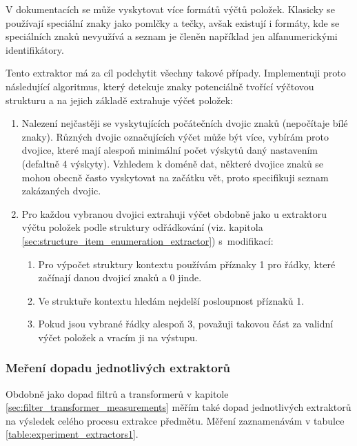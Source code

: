 \documentclass[thesis=M,czech]{FITthesis}[2019/12/23]
\begin{document}
V dokumentacích se může vyskytovat více formátů výčtů položek. Klasicky se používají speciální znaky jako pomlčky a tečky, avšak existují i formáty, kde se speciálních znaků nevyužívá a seznam je členěn například jen alfanumerickými identifikátory.

Tento extraktor má za cíl podchytit všechny takové případy. Implementuji proto následující algoritmus, který detekuje znaky potenciálně tvořící výčtovou strukturu a na jejich základě extrahuje výčet položek:

\begin{enumerate}
    \item Nalezení nejčastěji se vyskytujících počátečních dvojic znaků (nepočítaje bílé znaky). Různých dvojic označujících výčet může být více, vybírám proto dvojice, které mají alespoň minimální počet výskytů daný nastavením (defaltně 4 výskyty). Vzhledem k doméně dat, některé dvojice znaků se mohou obecně často vyskytovat na začátku vět, proto specifikuji seznam zakázaných dvojic.
    \item Pro každou vybranou dvojici extrahuji výčet obdobně jako u extraktoru výčtu položek podle struktury odřádkování (viz. kapitola \ref{sec:structure_item_enumeration_extractor}) s~modifikací:
    \begin{enumerate}
        \item Pro výpočet struktury kontextu používám příznaky 1 pro řádky, které začínají danou dvojicí znaků a 0 jinde.
        \item Ve struktuře kontextu hledám nejdelší posloupnost příznaků 1.
        \item Pokud jsou vybrané řádky alespoň 3, považuji takovou část za validní výčet položek a vracím ji na výstupu.
    \end{enumerate} 
\end{enumerate}

\subsubsection{Meření dopadu jednotlivých extraktorů}

Obdobně jako dopad filtrů a transformerů v kapitole \ref{sec:filter_transformer_measurements} měřím také dopad jednotlivých extraktorů na výsledek celého procesu extrakce předmětu. Měření zaznamenávám v tabulce \ref{table:experiment_extractors1}.
\end{document}
